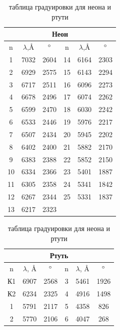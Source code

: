 \documentclass[14pt, a4paper]{extarticle}
\begin{document}
\begin{enumerate}
 	\begin{table}[h!]
 		\centering
 		\caption{таблица градуировки для неона и ртути}
 		\begin{tabular}{|c|c|c|c|c|c|}
 			\hline
 			\multicolumn{6}{|c|}{Неон} \\ \hline
 			n	&	$\lambda$,\AA	&	$\degree$	&	n	&	$\lambda$,\AA 	&	$\degree$	\\ \hline
			1	&	7032	&	2604	&	14	&	6164	&	2303	\\ \hline
			2	&	6929	&	2575	&	15	&	6143	&	2294	\\ \hline
			3	&	6717	&	2511	&	16	&	6096	&	2273	\\ \hline
			4	&	6678	&	2496	&	17	&	6074	&	2262	\\ \hline
			5	&	6599	&	2470	&	18	&	6030	&	2242	\\ \hline
			6	&	6533	&	2446	&	19	&	5976	&	2217	\\ \hline
			7	&	6507	&	2434	&	20	&	5945	&	2202	\\ \hline
			8	&	6402	&	2400	&	21	&	5882	&	2170	\\ \hline
			9	&	6383	&	2388	&	22	&	5852	&	2150	\\ \hline
			10	&	6334	&	2366	&	23	&	5401	&	1887	\\ \hline
			11	&	6305	&	2358	&	24	&	5341	&	1842	\\ \hline
			12	&	6267	&	2344	&	25	&	5331	&	1837	\\ \hline
			13	&	6217	&	2323	&		&		&		\\ \hline
 		\end{tabular}
 		\begin{tabular}{|c|c|c|c|c|c|}
 			\hline
 			\multicolumn{6}{|c|}{Ртуть} \\ \hline
 			n	&	$\lambda$, \AA	&	$\degree$	&	n	&	$\lambda$, \AA	&	$\degree$	\\ \hline
			К1	&	6907	&	2568	&	3	&	5461	&	1926	\\ \hline
			К2	&	6234	&	2325	&	4	&	4916	&	1498	\\ \hline
			1	&	5791	&	2117	&	5	&	4358	&	826	\\ \hline
			2	&	5770	&	2106	&	6	&	4047	&	268	\\ \hline
 		\end{tabular}
 	\end{table}



\end{enumerate}
\end{document}
